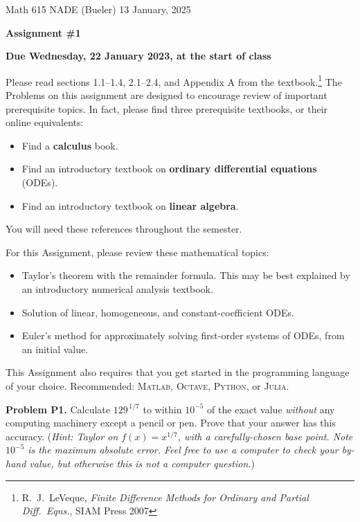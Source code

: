 \documentclass[12pt]{amsart}
\newcommand{\Julia}{\textsc{Julia}\xspace}
\newcommand{\Matlab}{\textsc{Matlab}\xspace}
\newcommand{\Octave}{\textsc{Octave}\xspace}
\newcommand{\Python}{\textsc{Python}\xspace}
\newcommand{\prob}[1]{\bigskip\noindent\textbf{#1}\quad }
\begin{document}
\scriptsize \noindent Math 615 NADE (Bueler) \hfill 13 January, 2025
\normalsize

\medskip\bigskip

\Large\centerline{\textbf{Assignment \#1}}
\large
\bigskip

\centerline{\textbf{Due Wednesday, 22 January 2023, at the start of class}}
\bigskip
\normalsize

\thispagestyle{empty}

\bigskip
Please read sections 1.1--1.4, 2.1--2.4, and Appendix A from the textbook.\footnote{R.~J.~LeVeque, \emph{Finite Difference Methods for Ordinary and Partial Diff.~Eqns.}, SIAM Press 2007}  The Problems on this assignment are designed to encourage review of important prerequisite topics.  In fact, please find three prerequisite textbooks, or their online equivalents:
\begin{itemize}
\item Find a \textbf{calculus} book.
\item Find an introductory textbook on \textbf{ordinary differential equations} (ODEs).
\item Find an introductory textbook on \textbf{linear algebra}.
\end{itemize}
You will need these references throughout the semester.

For this Assignment, please review these mathematical topics:
\begin{itemize}
  \item Taylor's theorem with the remainder formula.  This may be best explained by an introductory numerical analysis textbook.
  \item Solution of linear, homogeneous, and constant-coefficient ODEs.
  \item Euler's method for approximately solving first-order systems of ODEs, from an initial value.
\end{itemize}
This Assignment also requires that you get started in the programming language of your choice.  Recommended: \Matlab, \Octave, \Python, or \Julia.

\medskip
\prob{Problem P1.}  Calculate $129^{\,1/7}$ to within $10^{-5}$ of the exact value \emph{without} any computing machinery except a pencil or pen.  Prove that your answer has this accuracy.  (\emph{Hint: Taylor on $f(x)=x^{1/7}$, with a carefully-chosen base point.  Note $10^{-5}$ is the maximum absolute error.  Feel free to use a computer to \emph{check} your by-hand value, but otherwise this is not a computer question.})
\end{document}
